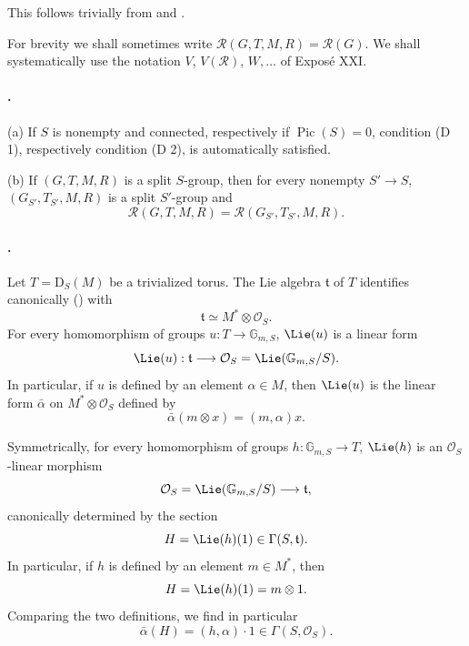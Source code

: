 This follows trivially from  and .

For brevity we shall sometimes write
\(\mathcal R(G,T,M,R)=\mathcal R(G)\). We shall systematically use
the notation \(V\), \(V(\mathcal R)\), \(W,\ldots\) of Exposé XXI.

\paragraph{.}
\textup{(a)} If \(S\) is nonempty and connected, respectively if
\(\operatorname{Pic}(S)=0\), condition \textup{(D 1)}, respectively
condition \textup{(D 2)}, is automatically satisfied.

\textup{(b)} If \((G,T,M,R)\) is a split \(S\)-group, then for every
nonempty \(S'\to S\), \((G_{S'},T_{S'},M,R)\) is a split
\(S'\)-group and
\[
  \mathcal R(G,T,M,R)
  =
  \mathcal R(G_{S'},T_{S'},M,R).
\]

\paragraph{.}
Let \(T=\mathrm D_S(M)\) be a trivialized torus. The Lie algebra
\(\mathfrak t\) of \(T\) identifies canonically \textup{()} with
\[
  \mathfrak t\simeq M^*\otimes\mathcal O_S.
\]
For every homomorphism of groups \(u:T\to\mathbb G_{m,S}\),
\(\Lie(u)\) is a linear form
\[
  \Lie(u):
  \mathfrak t\longrightarrow
  \mathcal O_S=\Lie(\mathbb G_{m,S}/S).
\]
In particular, if \(u\) is defined by an element \(\alpha\in M\),
then \(\Lie(u)\) is the linear form \(\bar\alpha\) on
\(M^*\otimes\mathcal O_S\) defined by
\[
  \bar\alpha(m\otimes x)=(m,\alpha)x.
\]

Symmetrically, for every homomorphism of groups
\(h:\mathbb G_{m,S}\to T\), \(\Lie(h)\) is an
\(\mathcal O_S\)-linear morphism
\[
  \mathcal O_S=\Lie(\mathbb G_{m,S}/S)
  \longrightarrow\mathfrak t,
\]
canonically determined by the section
\[
  H=\Lie(h)(1)\in\Gamma(S,\mathfrak t).
\]
In particular, if \(h\) is defined by an element \(m\in M^*\), then
\[
  H=\Lie(h)(1)=m\otimes 1.
\]
Comparing the two definitions, we find in particular
\[
  \bar\alpha(H)=(h,\alpha)\cdot 1
  \in\Gamma(S,\mathcal O_S).
\]


